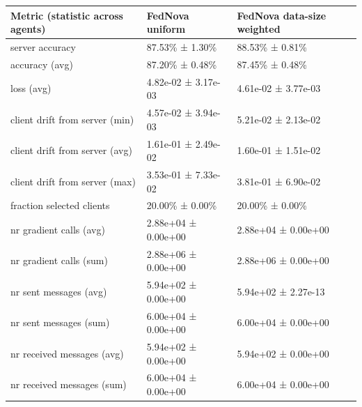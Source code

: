 \begin{tabular}{lll}
\hline
 Metric (statistic across agents)   & FedNova uniform     & FedNova data-size weighted   \\
\hline
 server accuracy                    & 87.53\% ± 1.30\%      & 88.53\% ± 0.81\%               \\
 accuracy (avg)                     & 87.20\% ± 0.48\%      & 87.45\% ± 0.48\%               \\
 loss (avg)                         & 4.82e-02 ± 3.17e-03 & 4.61e-02 ± 3.77e-03          \\
 client drift from server (min)     & 4.57e-02 ± 3.94e-03 & 5.21e-02 ± 2.13e-02          \\
 client drift from server (avg)     & 1.61e-01 ± 2.49e-02 & 1.60e-01 ± 1.51e-02          \\
 client drift from server (max)     & 3.53e-01 ± 7.33e-02 & 3.81e-01 ± 6.90e-02          \\
 fraction selected clients          & 20.00\% ± 0.00\%      & 20.00\% ± 0.00\%               \\
 nr gradient calls (avg)            & 2.88e+04 ± 0.00e+00 & 2.88e+04 ± 0.00e+00          \\
 nr gradient calls (sum)            & 2.88e+06 ± 0.00e+00 & 2.88e+06 ± 0.00e+00          \\
 nr sent messages (avg)             & 5.94e+02 ± 0.00e+00 & 5.94e+02 ± 2.27e-13          \\
 nr sent messages (sum)             & 6.00e+04 ± 0.00e+00 & 6.00e+04 ± 0.00e+00          \\
 nr received messages (avg)         & 5.94e+02 ± 0.00e+00 & 5.94e+02 ± 0.00e+00          \\
 nr received messages (sum)         & 6.00e+04 ± 0.00e+00 & 6.00e+04 ± 0.00e+00          \\
\hline
\end{tabular}